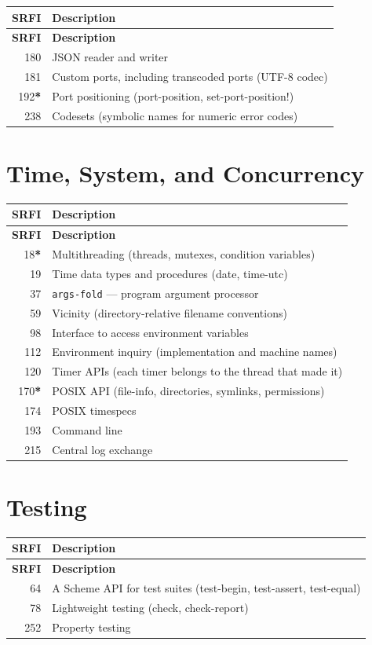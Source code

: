 \begin{longtable}{rp{9cm}}
\textbf{SRFI} & \textbf{Description} \\
\hline
\endfirsthead
\textbf{SRFI} & \textbf{Description} \\
\hline
\endhead
180 & JSON reader and writer \\
181 & Custom ports, including transcoded ports (UTF-8 codec) \\
192\textbf{*} & Port positioning (port-position, set-port-position!) \\
238 & Codesets (symbolic names for numeric error codes) \\
\end{longtable}

\section{Time, System, and Concurrency}

\begin{longtable}{rp{9cm}}
\textbf{SRFI} & \textbf{Description} \\
\hline
\endfirsthead
\textbf{SRFI} & \textbf{Description} \\
\hline
\endhead
18\textbf{*} & Multithreading (threads, mutexes, condition variables) \\
19 & Time data types and procedures (date, time-utc) \\
37 & \texttt{args-fold} --- program argument processor \\
59 & Vicinity (directory-relative filename conventions) \\
98 & Interface to access environment variables \\
112 & Environment inquiry (implementation and machine names) \\
120 & Timer APIs (each timer belongs to the thread that made it) \\
170\textbf{*} & POSIX API (file-info, directories, symlinks, permissions) \\
174 & POSIX timespecs \\
193 & Command line \\
215 & Central log exchange \\
\end{longtable}

\section{Testing}

\begin{longtable}{rp{9cm}}
\textbf{SRFI} & \textbf{Description} \\
\hline
\endfirsthead
\textbf{SRFI} & \textbf{Description} \\
\hline
\endhead
64 & A Scheme API for test suites (test-begin, test-assert, test-equal) \\
78 & Lightweight testing (check, check-report) \\
252 & Property testing \\
\end{longtable}

